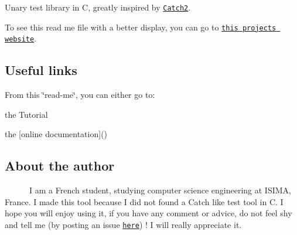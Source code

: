 \href{https://gitlab.com/BaptistePR/LAssert/commits/master}{\tt } \href{https://ci.appveyor.com/project/Klevh/lassert/branch/master}{\tt }

Unary test library in C, greatly inspired by \href{https://github.com/catchorg/Catch2}{\tt Catch2}.

To see this read me file with a better display, you can go to \href{https://klevh.github.io/LAssert/}{\tt this project\textquotesingle{}s website}.

\subsection*{Useful links}

From this \char`\"{}read-\/me\char`\"{}, you can either go to\+:
\begin{DoxyItemize}
\item the Tutorial
\item the \mbox{[}online documentation\mbox{]}()
\end{DoxyItemize}

\subsection*{About the author}

~~~~~~I am a French student, studying computer science engineering at I\+S\+I\+MA, France. I made this tool because I did not found a Catch like test tool in C. I hope you will enjoy using it, if you have any comment or advice, do not feel shy and tell me (by posting an issue \href{https://github.com/Klevh/LAssert/issues/new}{\tt here}) ! I will really appreciate it. 